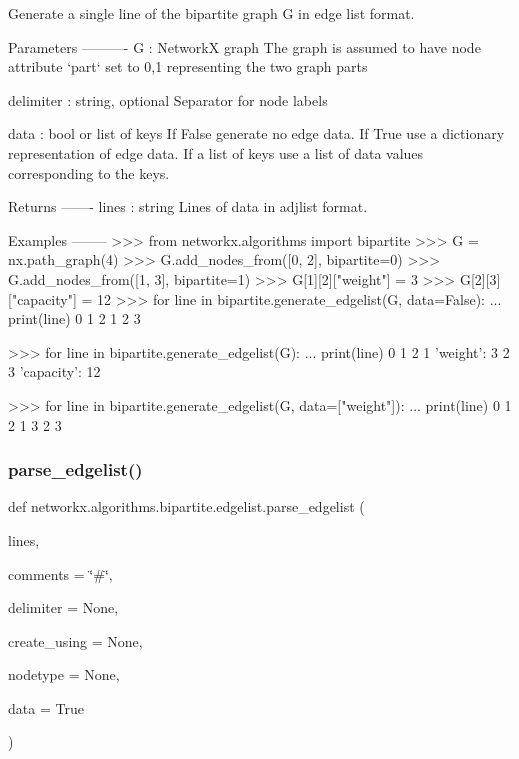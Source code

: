 \begin{DoxyVerb}Generate a single line of the bipartite graph G in edge list format.

Parameters
----------
G : NetworkX graph
   The graph is assumed to have node attribute `part` set to 0,1 representing
   the two graph parts

delimiter : string, optional
   Separator for node labels

data : bool or list of keys
   If False generate no edge data.  If True use a dictionary
   representation of edge data.  If a list of keys use a list of data
   values corresponding to the keys.

Returns
-------
lines : string
    Lines of data in adjlist format.

Examples
--------
>>> from networkx.algorithms import bipartite
>>> G = nx.path_graph(4)
>>> G.add_nodes_from([0, 2], bipartite=0)
>>> G.add_nodes_from([1, 3], bipartite=1)
>>> G[1][2]["weight"] = 3
>>> G[2][3]["capacity"] = 12
>>> for line in bipartite.generate_edgelist(G, data=False):
...     print(line)
0 1
2 1
2 3

>>> for line in bipartite.generate_edgelist(G):
...     print(line)
0 1 {}
2 1 {'weight': 3}
2 3 {'capacity': 12}

>>> for line in bipartite.generate_edgelist(G, data=["weight"]):
...     print(line)
0 1
2 1 3
2 3
\end{DoxyVerb}
 \mbox{\label{namespacenetworkx_1_1algorithms_1_1bipartite_1_1edgelist_afeb373f6e6e573ef4c4e28751ed3b015}} 
\subsubsection{\texorpdfstring{parse\+\_\+edgelist()}{parse\_edgelist()}}
{\footnotesize\ttfamily def networkx.\+algorithms.\+bipartite.\+edgelist.\+parse\+\_\+edgelist (\begin{DoxyParamCaption}\item[{}]{lines,  }\item[{}]{comments = {\ttfamily \char`\"{}\#\char`\"{}},  }\item[{}]{delimiter = {\ttfamily None},  }\item[{}]{create\+\_\+using = {\ttfamily None},  }\item[{}]{nodetype = {\ttfamily None},  }\item[{}]{data = {\ttfamily True} }\end{DoxyParamCaption})}

